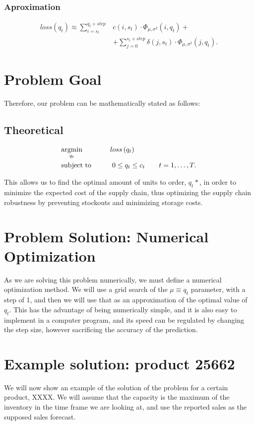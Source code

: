 \documentclass{OptiFlow}
\begin{document}
\subsubsection{Aproximation}
\begin{align*}
	loss\left( q_t \right)  \approx \sum_{i = s_t}^{q_t+step} &c\left( i,s_t \right) \cdot \Phi_{\mu, \sigma^2}\left( i, q_t \right) + \\
	&+ \sum_{j = 0}^{s_t + step} \delta\left( j,s_t \right) \cdot \Phi_{\mu, \sigma^2}\left( j,q_t \right) 
.\end{align*}

\section{Problem Goal}
Therefore, our problem can be mathematically stated as follows:
\subsection{Theoretical}
\begin{align*}
	&\underset{q_t}{\text{argmin}} \text{\qquad \qquad}loss\left( q_t \right)\\ 
	&\text{subject to}
		\text{\qquad\quad} 0 \le q_t \le  c_t \text{\qquad} t = 1,\ldots,T
.\end{align*}

This allows us to find the optimal amount of units to order, $q_t*$, in order to minimize the expected cost of the supply chain,
thus optimizing the supply chain robustness by preventing stockouts and minimizing storage costs.

\section{Problem Solution: Numerical Optimization}
As we are solving this problem numerically, we must define a numerical optimization method.
We will use a grid search of the $\mu \equiv q_t$ parameter, with a step of 1, and then we will use that as an approximation of the optimal value of $q_t$.
This has the advantage of being numerically simple, and it is also easy to implement in a computer program, and its speed can be 
regulated by changing the step size, however sacrificing the accuracy of the prediction.

\section{Example solution: product 25662}
We will now show an example of the solution of the problem for a certain product, XXXX.
We will assume that the capacity is the maximum of the inventory in the time frame we are looking at, and use the reported sales 
as the supposed sales forecast.
\end{document}
